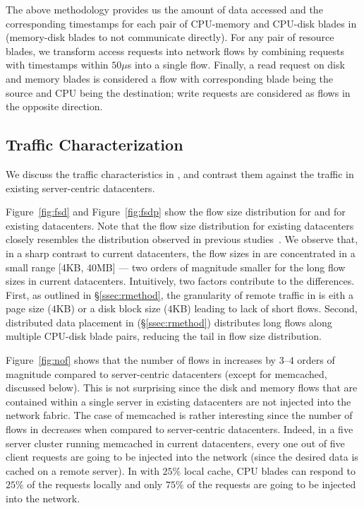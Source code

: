 The above methodology provides us the amount of data accessed and the corresponding timestamps for each pair of CPU-memory and CPU-disk blades in \dis (memory-disk blades to not communicate directly). For any pair of resource blades, we transform access requests into network flows by combining requests with timestamps within $50\mu$s into a single flow.  Finally, a read request on disk and memory blades is considered a flow with corresponding blade being the source and CPU being the destination; write requests are considered as flows in the opposite direction.

\subsection{Traffic Characterization} 
\label{ssec:flc}
We discuss the traffic characteristics in \dis, and contrast them against the traffic in existing server-centric datacenters.

Figure~\ref{fig:fsd} and Figure~\ref{fig:fsdp} show the flow size distribution for \dis and for existing datacenters. Note that the flow size distribution for existing datacenters closely resembles the distribution observed in previous studies~\cite{srikanth, theo}. We observe that, in a sharp contrast to current datacenters, the flow sizes in \dis are concentrated in a small range [4KB, 40MB] --- two orders of magnitude smaller for the long flow sizes in current datacenters. Intuitively, two factors contribute to the differences. First, as outlined in \S\ref{ssec:rmethod}, the granularity of remote traffic in \dis is eith a page size ($4$KB) or a disk block size ($4$KB) leading to lack of short flows. Second, distributed data placement in \dis (\S\ref{ssec:rmethod}) distributes long flows along multiple CPU-disk blade pairs, reducing the tail in flow size distribution.

Figure~\ref{fig:nof} shows that the number of flows in \dis increases by $3$--$4$ orders of magnitude compared to server-centric datacenters (except for memcached, discussed below). This is not surprising since the disk and memory flows that are contained within a single server in existing datacenters are not injected into the network fabric. The case of memcached is rather interesting since the number of flows in \dis decreases when compared to server-centric datacenters. Indeed, in a five server cluster running memcached in current datacenters, every one out of five client requests are going to be injected into the network (since the desired data is cached on a remote server). In \dis with $25\%$ local cache, CPU blades can respond to $25\%$ of the requests locally and only $75\%$ of the requests are going to be injected into the network. 

